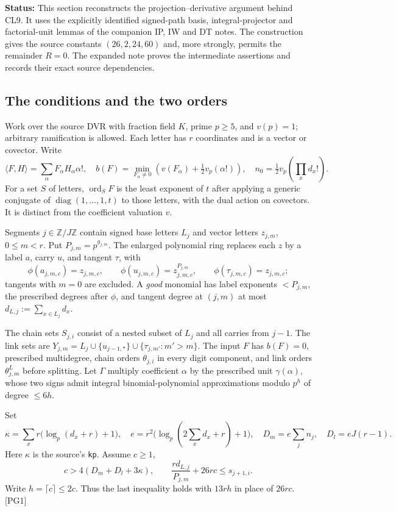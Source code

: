 \documentclass[11pt,a4paper]{article}
\numberwithin{equation}{section}
\theoremstyle{remark}\newtheorem{remark}[theorem]{Remark}
\newcommand{\status}[1]{\textbf{Status:} #1}
\begin{document}
\status{This section reconstructs the projection--derivative argument behind CL9. It uses the explicitly identified signed-path basis, integral-projector and factorial-unit lemmas of the companion IP, IW and DT notes. The construction gives the source constants $(26,2,24,60)$ and, more strongly, permits the remainder $R=0$. The expanded note proves the intermediate assertions and records their exact source dependencies.}

\subsection{The conditions and the two orders}

Work over the source DVR with fraction field $K$, prime $p\ge5$, and $v(p)=1$; arbitrary ramification is allowed. Each letter has $r$ coordinates and is a vector or covector. Write
\[
 \langle F,H\rangle=\sum_\alpha F_\alpha H_\alpha\alpha!,\quad
 b(F)=\min_{F_\alpha\ne0}\left(v(F_\alpha)+\tfrac12v_p(\alpha!)\right),\quad
 n_0=\tfrac12v_p\!\left(\prod_xd_x!\right).
\]
For a set $S$ of letters, $\operatorname{ord}_S F$ is the least exponent of $t$ after applying a generic conjugate of $\operatorname{diag}(1,\ldots,1,t)$ to those letters, with the dual action on covectors. It is distinct from the coefficient valuation $v$.

Segments $j\in\mathbb Z/J\mathbb Z$ contain signed base letters $L_j$ and vector letters $z_{j,m}$, $0\le m<r$. Put $P_{j,m}=p^{g_{j,m}}$. The enlarged polynomial ring replaces each $z$ by a label $a$, carry $u$, and tangent $\tau$, with
\[
 \phi(a_{j,m,c})=z_{j,m,c},\qquad
 \phi(u_{j,m,c})=z_{j,m,c}^{P_{j,m}},\qquad
 \phi(\tau_{j,m,c})=z_{j,m,c};
\]
tangents with $m=0$ are excluded. A \emph{good} monomial has label exponents $<P_{j,m}$, the prescribed degrees after $\phi$, and tangent degree at $(j,m)$ at most $d_{L,j}:=\sum_{x\in L_j}d_x$.

The chain sets $S_{j,i}$ consist of a nested subset of $L_j$ and all carries from $j-1$. The link sets are
$Y_{j,m}=L_j\cup\{u_{j-1,*}\}\cup\{\tau_{j,m'}:m'>m\}$.
The input $F$ has $b(F)=0$, prescribed multidegree, chain orders $\theta_{j,i}$ in every digit component, and link orders $\theta^L_{j,m}$ before splitting. Let $\Gamma$ multiply coefficient $\alpha$ by the prescribed unit $\gamma(\alpha)$, whose two signs admit integral binomial-polynomial approximations modulo $p^h$ of degree $\le6h$.

Set
\[
 \kappa=\sum_x r\bigl(\log_p(d_x+r)+1\bigr),\quad
 e=r^2\bigl(\log_p(2\sum_xd_x+r)+1\bigr),\quad
 D_m=e\sum_j n_j,\quad D_l=eJ(r-1).
\]
Here $\kappa$ is the source's \texttt{kp}. Assume $c\ge1$,
\[
 c>4(D_m+D_l+3\kappa),\qquad
 \frac{r d_{L,j}}{P_{j,m}}+26rc\le s_{j+1,i}.
 \tag{PG.1}
\]
Write $h=\lceil c\rceil\le2c$. Thus the last inequality holds with $13rh$ in place of $26rc$. \textsf{[PG1]}\cite{gram-construction}
\end{document}
